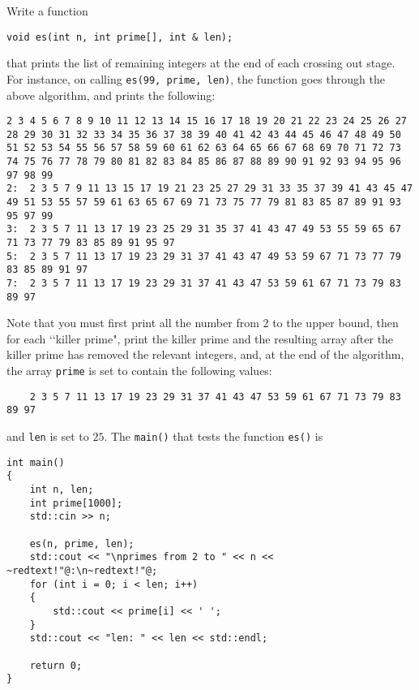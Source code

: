 Write a function
\begin{Verbatim}[frame=single,fontsize=\footnotesize]
void es(int n, int prime[], int & len);
\end{Verbatim}
that prints the list of remaining integers at the end of each crossing out
stage. For instance, on calling \verb!es(99, prime, len)!, the function goes
through the above algorithm, and prints the following:

\texttt{2 3 4 5 6 7 8 9 10 11 12 13 14 15 16 17 18 19 20 21 22 23 24 25 26 27 28 29 30 31 32 33 34 35 36 37 38 39 40 41 42 43 44 45 46 47 48 49 50 51 52 53 54 55 56 57 58 59 60 61 62 63 64 65 66 67 68 69 70 71 72 73 74 75 76 77 78 79 80 81 82 83 84 85 86 87 88 89 90 91 92 93 94 95 96 97 98 99} \\
\texttt{2:\,\,2 3 5 7 9 11 13 15 17 19 21 23 25 27 29 31 33 35 37 39 41 43 45 47 49 51 53 55 57 59 61 63 65 67 69 71 73 75 77 79 81 83 85 87 89 91 93 95 97 99} \\
\texttt{3:\,\,2 3 5 7 11 13 17 19 23 25 29 31 35 37 41 43 47 49 53 55 59 65 67 71 73 77 79 83 85 89 91 95 97} \\
\texttt{5:\,\,2 3 5 7 11 13 17 19 23 29 31 37 41 43 47 49 53 59 67 71 73 77 79 83 85 89 91 97} \\
\texttt{7:\,\,2 3 5 7 11 13 17 19 23 29 31 37 41 43 47 53 59 61 67 71 73 79 83 89 97}


Note that you must first print all the number from $2$ to the upper bound,
then for each \lq\lq killer prime", print the killer prime and the resulting
array after the killer prime has removed the relevant integers, and, at the
end of the algorithm, the array \verb!prime! is set to contain the following
values:

\verb!    2 3 5 7 11 13 17 19 23 29 31 37 41 43 47 53 59 61 67 71 73 79 83 89 97!

and \verb!len! is set to $25$. The \verb!main()! that tests the function
\verb!es()! is

\begin{Verbatim}[frame=single,commandchars=\~\!\@]
int main()
{
    int n, len;
    int prime[1000];
    std::cin >> n;
    
    es(n, prime, len);
    std::cout << "\nprimes from 2 to " << n << ~redtext!"@:\n~redtext!"@; 
    for (int i = 0; i < len; i++)
    {
        std::cout << prime[i] << ' ';
    }
    std::cout << "len: " << len << std::endl;

    return 0;    
}
\end{Verbatim}


